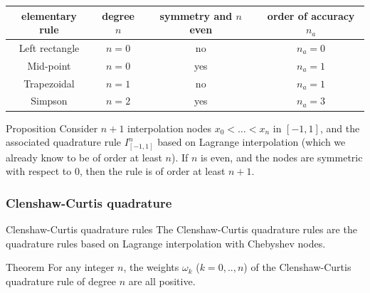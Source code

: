 \documentclass{article}
\begin{document}
        \begin{table}[H]
            \centering
            \begin{tabular}{|c|c|c|c|}
                \hline
                \rowcolor{gray!30} elementary rule & degree $n$ & symmetry and $n$ even & order of accuracy $n_a$ \\
                \hline
                Left rectangle & $n=0$ & no & $n_a = 0$ \\
                \hline
                \rowcolor{gray!10} Mid-point & $n=0$ & yes & $n_a = 1$ \\
                \hline
                Trapezoidal & $n=1$ & no & $n_a = 1$ \\
                \hline
                \rowcolor{gray!10} Simpson & $n=2$ & yes & $n_a = 3$ \\
                \hline
            \end{tabular}
            \label{tab:What}
        \end{table}

        \vspace{10pt}

        \begin{theorem}{Proposition}
            Consider $n+1$ interpolation nodes $x_0<\ldots<x_n$ in $[-1,1]$, and the associated quadrature rule $I^n_{[-1,1]}$ based on Lagrange interpolation (which we already know to be of order at least $n$). If $n$ is even, and the nodes are symmetric with respect to $0$, then the rule is of order at least $n+1$.
        \end{theorem}

        \newpage

        \subsubsection{Clenshaw-Curtis quadrature}

        \begin{definition}{Clenshaw-Curtis quadrature rules}
            The Clenshaw-Curtis quadrature rules are the quadrature rules based on Lagrange interpolation with Chebyshev nodes.
        \end{definition}

        \vspace{10pt}

        \begin{theorem}{Theorem}
            For any integer $n$, the weights $\omega_k$ ($k=0,..,n$) of the Clenshaw-Curtis quadrature rule of degree $n$ are all positive.
        \end{theorem}
\end{document}
